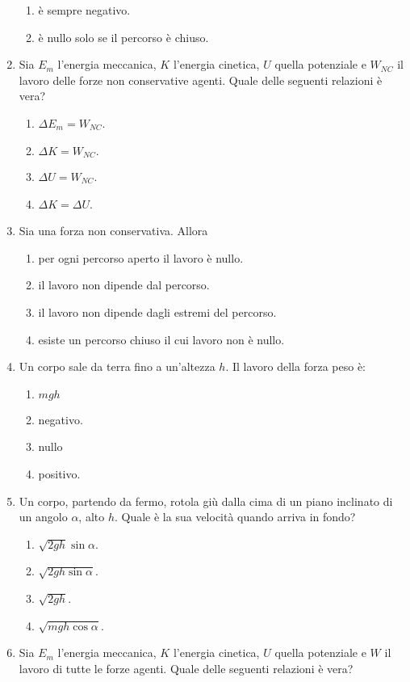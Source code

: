 \documentclass{article}
\begin{document}
\begin{enumerate}
\begin{enumerate}[label=\Alph*.]
    \item è sempre negativo.
    \item è nullo solo se il percorso è chiuso.
  \end{enumerate}
  \item Sia $E_m$ l'energia meccanica, $K$ l'energia cinetica, $U$ quella potenziale e $W_{NC}$ il lavoro delle forze non conservative agenti. Quale delle seguenti relazioni è vera?
  \begin{enumerate}[label=\Alph*.]
    \item $\Delta E_m=W_{NC}$.
    \item $\Delta K=W_{NC}.$
    \item $\Delta U=W_{NC}$.
    \item $\Delta K = \Delta U$.
  \end{enumerate}
  \item Sia  una forza non conservativa. Allora
  \begin{enumerate}[label=\Alph*.]
    \item per ogni percorso aperto il lavoro è nullo.
    \item il lavoro non dipende dal percorso.
    \item il lavoro non dipende dagli estremi del percorso.
    \item esiste un percorso chiuso il cui lavoro non è nullo.
  \end{enumerate}
  \item Un corpo sale da terra fino a un'altezza $h$. Il lavoro della forza peso è:
  \begin{enumerate}[label=\Alph*.]
    \item $mgh$
    \item negativo.
    \item nullo
    \item positivo.
  \end{enumerate}
  \item Un corpo, partendo da fermo, rotola giù dalla cima di un piano inclinato di un angolo $\alpha$, alto $h$. Quale è la sua velocità quando arriva in fondo?
  \begin{enumerate}[label=\Alph*.]
    \item $\sqrt{2gh}\sin\alpha$.
    \item $\sqrt{2gh\sin\alpha}$.
    \item $\sqrt{2gh}$.
    \item $\sqrt{mgh\cos\alpha}$.
  \end{enumerate}
  \item Sia $E_m$ l'energia meccanica, $K$ l'energia cinetica, $U$ quella potenziale e $W$ il lavoro di tutte le forze agenti. Quale delle seguenti relazioni è vera?

\end{enumerate}
\end{document}
